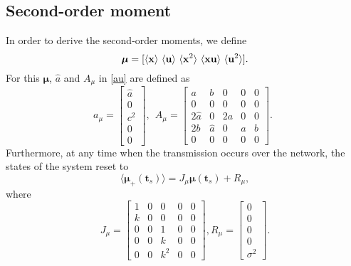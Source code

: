 \documentclass[letterpaper, 10 pt,one column, conference]{ieeeconf}  %
\begin{document}
\subsection{Second-order moment}
In order to derive the second-order moments, we define
\begin{equation}
\boldsymbol \mu = [\langle \bold x \rangle \ \langle \bold u \rangle \ \langle \bold x^2 \rangle\ \langle \bold x \bold u \rangle \ \langle \bold u^2 \rangle ].
\end{equation}
For this $\boldsymbol \mu$, $\hat{a}$ and $A_\mu$ in \eqref{au} are defined as 
	\begin{equation}
 a_\mu =   \left[\begin{array}{c}
	\hat{a} \\ 0 \\ c^2\\ 0 \\ 0  \end{array}\right], \ \ A_\mu = \left[\begin{array}{ccccc}
	a & b& 0 & 0 & 0\\ 0 & 0& 0 & 0& 0 \\ 2\hat{a} & 0& 2 a& 0& 0 \\ 2b & \hat{a}& 0 & a& b \\ 0 & 0& 0 & 0& 0
	\end{array}\right]. \ \ 
	\end{equation}
Furthermore, at any time when the transmission occurs over the network, the states of the system reset to
\begin{equation}
\langle \boldsymbol \mu_+(\boldsymbol t_s) \rangle  = J_\mu \boldsymbol \mu(\boldsymbol t_s)+ R_\mu, \label{mu reset0}
\end{equation}
where
\begin{equation}
J_\mu = \left[\begin{array}{ccccc}
	1 & 0& 0 & 0 & 0\\ k& 0& 0 & 0& 0 \\ 0 & 0& 1& 0& 0\\ 0 & 0& k & 0& 0 \\ 0 & 0& k^2 & 0& 0
	\end{array}\right], R_\mu = \left[\begin{array}{c}
	0\\ 0 \\ 0 \\ 0 \\ \sigma^2
	\end{array}\right].
\end{equation}
\end{document}
